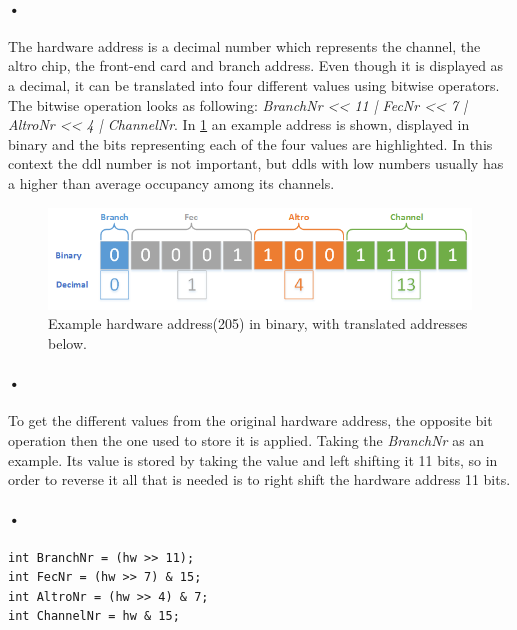 \documentclass[a4paper, 12pt]{report}
\begin{document}
\paragraph{•}
The hardware address is a decimal number which represents the channel, the \gls{altro} chip, the front-end card and branch address.
Even though it is displayed as a decimal, it can be translated into four different values using bitwise operators.
The bitwise operation looks as following: \textit{BranchNr << 11 | FecNr << 7 | AltroNr << 4 | ChannelNr}.
In \ref{fig:hw-binary} an example address is shown, displayed in binary and the bits representing each of the four values are highlighted.
In this context the ddl number is not important, but ddls with low numbers usually has a higher than average occupancy among its channels.

\begin{figure}[h!]
	\centering
		\includegraphics[width=1.0\textwidth]{images/hw-binary.png}
		\caption{Example hardware address(205) in binary, with translated addresses below.}
		\label{fig:hw-binary}
\end{figure}

\paragraph{•}
To get the different values from the original hardware address, the opposite bit operation then the one used to store it is applied.
Taking the \textit{BranchNr} as an example.
Its value is stored by taking the value and left shifting it 11 bits, so in order to reverse it all that is needed is to right shift the hardware address 11 bits.
\paragraph{•}
\begin{minipage}{\linewidth}
\begin{lstlisting}[caption=Bitwise operation to retrieve values from the hardware address., label=lst:bit-operation]
int BranchNr = (hw >> 11);
int FecNr = (hw >> 7) & 15;
int AltroNr = (hw >> 4) & 7;
int ChannelNr = hw & 15;
\end{lstlisting}
\end{minipage}
\end{document}
